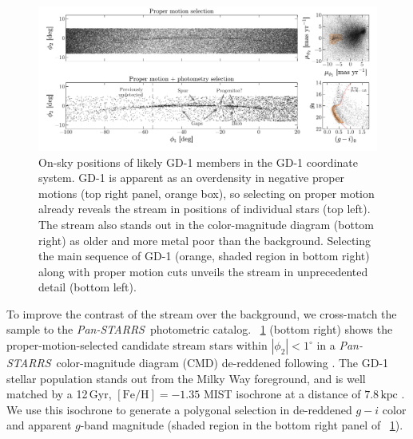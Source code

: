 \documentclass[modern]{aastex62}
\newcommand{\pans}{\textsl{Pan-STARRS}}
\newcommand{\kpc}{\textrm{kpc}}
\newcommand{\feh}{\ensuremath{[\textrm{Fe} / \textrm{H}]}}
\begin{document}
\begin{figure}
\begin{center}
\includegraphics[width=\textwidth]{gd1_sample.pdf}
\end{center}
\caption{
On-sky positions of likely GD-1 members in the GD-1 coordinate system.
GD-1 is apparent as an overdensity in negative proper motions (top right panel,
orange box), so selecting on proper motion already reveals the stream in
positions of individual stars (top left).
The stream also stands out in the color-magnitude diagram (bottom right) as
older and more metal poor than the background.
Selecting the main sequence of GD-1 (orange, shaded region in bottom right)
along with proper motion cuts unveils the stream in unprecedented detail (bottom
left).
}
\label{fig:selection}
\end{figure}

To improve the contrast of the stream over the background, we cross-match the
sample to the \pans\ photometric catalog. %
\figurename~\ref{fig:selection} (bottom right) shows the proper-motion-selected
candidate stream stars within $\left|\phi_2\right| < 1^\circ$ in a \pans\
color-magnitude diagram (CMD) de-reddened following \citet{Schlafly:2011}.
The GD-1 stellar population stands out from the Milky Way foreground, and is well matched by a 12\,Gyr, $\feh = -1.35$ MIST isochrone at a distance of $7.8\,\kpc$ \citep[red line in \figurename~\ref{fig:selection},][]{Dotter:2016, Choi:2016, Paxton:2011}.
We use this isochrone to generate a polygonal selection in de-reddened $g-i$
color and apparent $g$-band magnitude (shaded region in the
bottom right panel of \figurename~\ref{fig:selection}).
\end{document}
